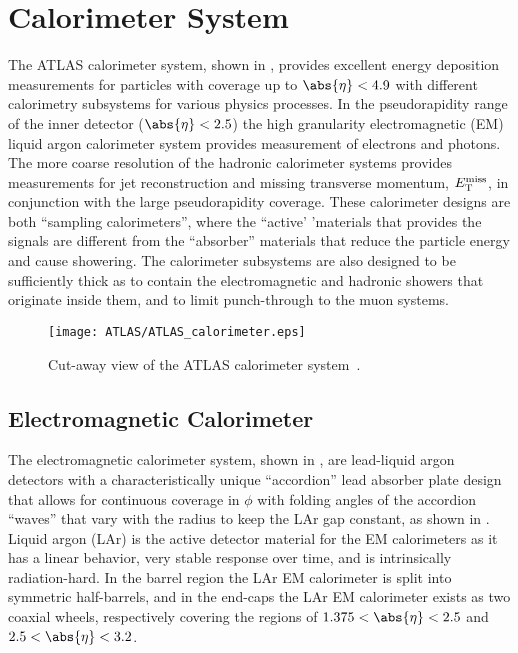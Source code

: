 \section{Calorimeter System}\label{sec:ATLAS_calo}

The ATLAS calorimeter system, shown in , provides excellent energy deposition measurements for particles with coverage up to $\abs{\eta} < 4.9$ with different calorimetry subsystems for various physics processes.
In the pseudorapidity range of the inner detector ($\abs{\eta} < 2.5$) the high granularity electromagnetic (EM) liquid argon calorimeter system provides measurement of electrons and photons.
The more coarse resolution of the hadronic calorimeter systems provides measurements for jet reconstruction and missing transverse momentum, $E_{\mathrm{T}}^{\mathrm{miss}}$, in conjunction with the large pseudorapidity coverage.
These calorimeter designs are both ``sampling calorimeters'', where the ``active' 'materials that provides the signals are different from the ``absorber'' materials that reduce the particle energy and cause showering.
The calorimeter subsystems are also designed to be sufficiently thick as to contain the electromagnetic and hadronic showers that originate inside them, and to limit punch-through to the muon systems.

\begin{figure}[htbp]
 \centering
 \texttt{[image: ATLAS/ATLAS\_calorimeter.eps]}
 \caption[Cut-away view of the ATLAS calorimeter system.]{%
  Cut-away view of the ATLAS calorimeter system~\cite{Pequenao:1095927}.}\label{fig:ATLAS_calorimeter}
\end{figure}

\subsection{Electromagnetic Calorimeter}\label{sec:ATLAS_electromagnetic_calorimeter}

The electromagnetic calorimeter system, shown in , are lead-liquid argon detectors with a characteristically unique ``accordion'' lead absorber plate design that allows for continuous coverage in $\phi$ with folding angles of the accordion ``waves'' that vary with the radius to keep the LAr gap constant, as shown in .
Liquid argon (LAr) is the active detector material for the EM calorimeters as it has a linear behavior, very stable response over time, and is intrinsically radiation-hard.
In the barrel region the LAr EM calorimeter is split into symmetric half-barrels, and in the end-caps the LAr EM calorimeter exists as two coaxial wheels, respectively covering the regions of $1.375 < \abs{\eta} < 2.5$ and $2.5 < \abs{\eta} < 3.2$.

